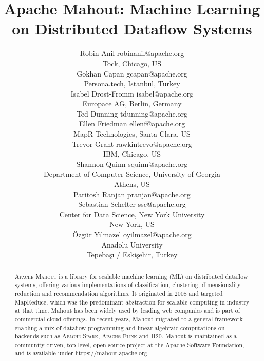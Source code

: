 \documentclass[twoside,11pt]{article}
\begin{document}
\title{Apache Mahout: Machine Learning on Distributed Dataflow Systems}

\author{\name Robin Anil \email robinanil@apache.org\\
  \addr Tock, Chicago, US\\
  \name Gokhan Capan \email gcapan@apache.org\\
  \addr Persona.tech, Istanbul, Turkey\\
  \name Isabel Drost-Fromm \email isabel@apache.org\\
  \addr Europace AG, Berlin, Germany\\
  \name Ted Dunning \email tdunning@apache.org\\
  \name Ellen Friedman \email ellenf@apache.org\\
  \addr MapR Technologies, Santa Clara, US\\
  \name Trevor Grant \email rawkintrevo@apache.org\\
  \addr IBM, Chicago, US\\
  \name Shannon Quinn \email squinn@apache.org\\
  \addr Department of Computer Science, University of Georgia\\
  \addr Athens, US\\ 
  \name Paritosh Ranjan \email pranjan@apache.org\\
  \name Sebastian Schelter \email ssc@apache.org\\
  \addr Center for Data Science, New York University\\
  \addr New York, US\\
  \name Özgür Yılmazel \email oyilmazel@apache.org\\
  \addr Anadolu University\\
  \addr Tepebaşı / Eskişehir, Turkey\\
}

\editor{}

\maketitle

\begin{abstract}%
\textsc{Apache Mahout} is a library for scalable machine learning (ML) on distributed dataflow systems, offering various implementations of classification, clustering, dimensionality reduction and recommendation algorithms. It originated in 2008 and targeted MapReduce, which was the predominant abstraction for scalable computing in industry at that time. Mahout has been widely used by leading web companies and is part of commercial cloud offerings. In recent years, Mahout migrated to a general framework enabling a mix of dataflow programming and linear algebraic computations on backends such as \textsc{Apache Spark}, \textsc{Apache Flink} and \textsc{H20}. Mahout is maintained as a community-driven, top-level, open source project at the Apache Software Foundation, and is available under \url{https://mahout.apache.org}. 
\end{abstract}
\end{document}
